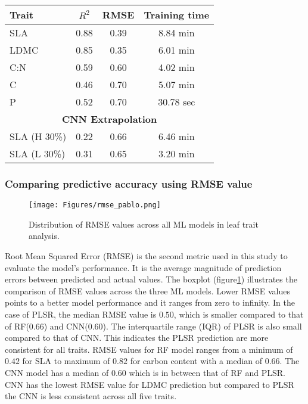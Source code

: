 \documentclass[12pt,a4paper]{report}
\begin{document}
\begin{table}[h!]
\begin{tabular}{lccc}
\midrule
\textbf{Trait} & \textbf{$R^2$} & \textbf{RMSE} & \textbf{Training time} \\
\midrule
SLA  & 0.88 & 0.39 & 8.84 min \\
LDMC & 0.85 & 0.35 & 6.01 min \\
C:N  & 0.59 & 0.60 & 4.02 min \\
C    & 0.46 & 0.70 & 5.07 min \\
P    & 0.52 & 0.70 & 30.78 sec \\
\midrule
\multicolumn{4}{c}{\textbf{{CNN Extrapolation}}} \\ 
\midrule
SLA (H 30\%) & 0.22 & 0.66 &  6.46 min \\
SLA  (L 30\%)& 0.31 & 0.65 & 3.20 min \\
\bottomrule
\end{tabular}
\end{table}

\subsubsection*{Comparing predictive accuracy using RMSE value}


\begin{figure}[h]
    \centering
    \texttt{[image: Figures/rmse\_pablo.png]}
    \caption{Distribution of RMSE values across all ML models in leaf trait analysis.}
    \label{fig:rmse_pablo}
\end{figure}


Root Mean Squared Error (RMSE) is the second metric used in this study to evaluate the model's performance. It is the average magnitude of prediction errors between predicted and actual values. The boxplot (figure\ref{fig:rmse_pablo}) illustrates the comparison of RMSE values across the three ML models. Lower RMSE values points to a better model performance and it ranges from zero to infinity. In the case of PLSR, the median RMSE value is $0.50$, which is smaller compared to that of RF($0.66$) and CNN($0.60$). The interquartile range (IQR) of PLSR is also small compared to that of CNN. This indicates the PLSR prediction are more consistent for all traits. RMSE values for RF model ranges from a minimum of $0.42$ for SLA to maximum of $0.82$ for carbon content with a median of $0.66$. The CNN model has a median of $0.60$ which is in between that of RF and PLSR. CNN has the lowest RMSE value for LDMC prediction but compared to PLSR the CNN is less consistent across all five traits. \\
\end{document}
